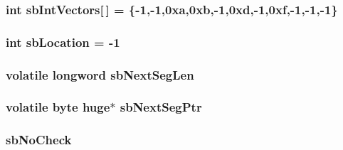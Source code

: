 \label{ID__SD_8C_a52f9935f686fca626defb7ec36292506}
\hypertarget{ID__SD_8C_a74811b52c1a1ba6decadc52cfa225e25}{
\subsubsection[{sbIntVectors}]{\setlength{\rightskip}{0pt plus 5cm}int {\bf sbIntVectors}\mbox{[}$\,$\mbox{]} = \{-\/1,-\/1,0xa,0xb,-\/1,0xd,-\/1,0xf,-\/1,-\/1,-\/1\}}}
\label{ID__SD_8C_a74811b52c1a1ba6decadc52cfa225e25}
\hypertarget{ID__SD_8C_ad1041dc24d08c7fc215c300fe99c1609}{
\subsubsection[{sbLocation}]{\setlength{\rightskip}{0pt plus 5cm}int {\bf sbLocation} = -\/1}}
\label{ID__SD_8C_ad1041dc24d08c7fc215c300fe99c1609}
\hypertarget{ID__SD_8C_afaf42553cd16229e97ca17918ed5c7e0}{
\subsubsection[{sbNextSegLen}]{\setlength{\rightskip}{0pt plus 5cm}volatile {\bf longword} {\bf sbNextSegLen}}}
\label{ID__SD_8C_afaf42553cd16229e97ca17918ed5c7e0}
\hypertarget{ID__SD_8C_a2c977a80978d5b38196f2154168d95b1}{
\subsubsection[{sbNextSegPtr}]{\setlength{\rightskip}{0pt plus 5cm}volatile {\bf byte} huge$\ast$ {\bf sbNextSegPtr}}}
\label{ID__SD_8C_a2c977a80978d5b38196f2154168d95b1}
\hypertarget{ID__SD_8C_a770a1bd139fc8c8c3eabbaee656f7628}{
\subsubsection[{sbNoCheck}]{ {\bf sbNoCheck}}}
